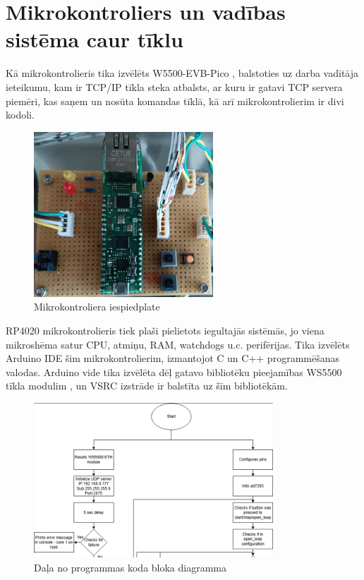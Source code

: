 \section{Mikrokontroliers un vadības sistēma caur tīklu}
Kā mikrokontrolieris tika izvēlēts W5500-EVB-Pico \cite{pico}, balstoties uz darba vadītāja ieteikumu, kam ir TCP/IP tīkla steka atbalsts, ar kuru ir gatavi TCP servera piemēri, kas saņem un nosūta komandas tīklā, kā arī mikrokontrolierim ir divi kodoli.
\begin{figure}[H]
	\centering
    \includegraphics[width=0.6\textwidth]{pictures/mcu_board.jpg}\hspace{1cm}
    \caption{Mikrokontroliera iespiedplate}
\end{figure}
RP4020 mikrokontrolieris tiek plaši pielietots iegultajās sistēmās, jo viena mikroshēma satur CPU, atmiņu, RAM, watchdogs u.c. perifērijas. Tika izvēlēts Arduino IDE šim mikrokontrolierim, izmantojot C un C++ programmēšanas valodas. Arduino vide tika izvēlēta dēļ gatavo bibliotēku pieejamības WS5500 tīkla modulim \cite{ws5500}, un VSRC izstrāde ir balstīta uz šīm bibliotēkām.
\begin{figure}[H]
	\centering
    \includegraphics[width=0.8\textwidth]{pictures/prog_code_1.png}\hspace{1cm}
    \caption{Daļa no programmas koda bloka diagramma}
\end{figure}
